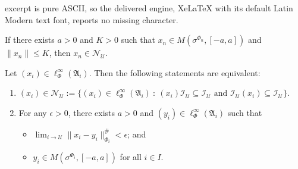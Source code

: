 \documentclass[10pt,a4paper]{amsart}
\def\cal{\mathcal}
\newcommand\cU{{\cal U}}
\begin{document}
excerpt is pure ASCII, so the delivered engine, XeLaTeX with its default Latin Modern text font, reports no missing character.
\begin{lem}\label{modcommutelem2}
    If there exists $a > 0$ and $K > 0$ such that $x_n \in M(\sigma^{\Phi_{n}},[-a,a])$ and $\|x_n\| \leq K$, then $x_n \in \cal N_{\cU}$.
\end{lem}

\begin{thm}\label{ultracontinuous}
    Let $(x_i) \in \ell_{\Phi}^\infty(\mathfrak{A}_i)$.  Then the following statements are equivalent:
    \begin{enumerate}
        \item $(x_i) \in \cal N_{\cU} := \{(x_i) \in \ell_{\Phi}^\infty(\mathfrak{A}_i) \ : \ (x_i) \cal I_{\cU} \subseteq \cal I_{\cU} \text{ and } \cal I_{\cU} (x_i)  \subseteq \cal I_{\cU}\}$.
        \item For any $\epsilon > 0$, there exists $a > 0$ and $(y_i) \in \ell_{\Phi}^\infty(\mathfrak{A}_i)$ such that
        \begin{itemize}
            \item $\lim_{i \to \cU} \|x_i - y_i\|^\#_{\Phi_i} < \epsilon$; and
            \item $y_i \in M(\sigma^{\Phi_i}, [-a, a])$ for all $i \in I$.
        \end{itemize}
    \end{enumerate}
\end{thm}
\end{document}
